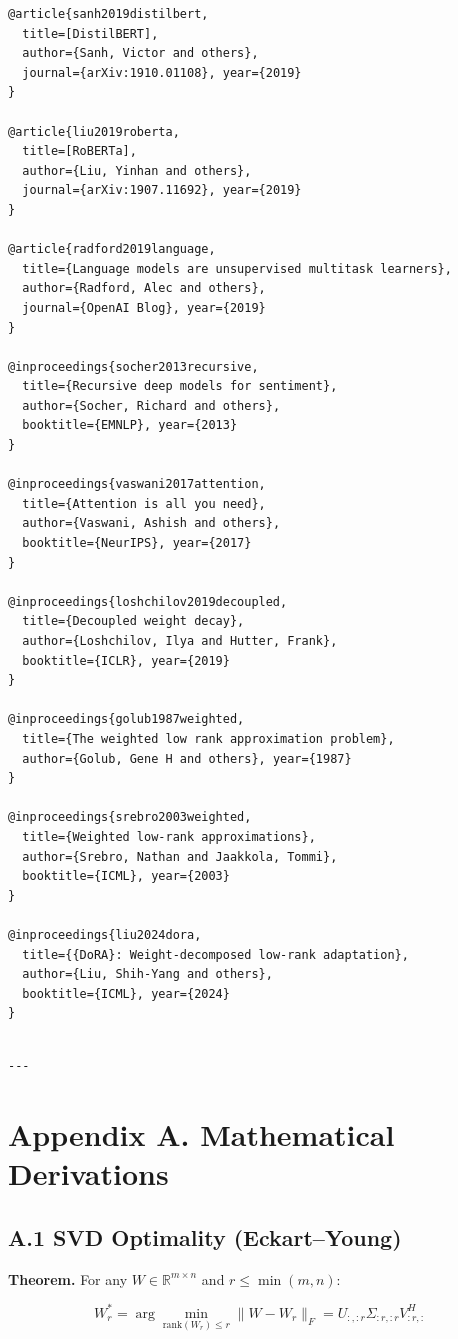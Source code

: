 \begin{lstlisting}
@article{sanh2019distilbert,
  title=[DistilBERT],
  author={Sanh, Victor and others},
  journal={arXiv:1910.01108}, year={2019}
}

@article{liu2019roberta,
  title=[RoBERTa],
  author={Liu, Yinhan and others},
  journal={arXiv:1907.11692}, year={2019}
}

@article{radford2019language,
  title={Language models are unsupervised multitask learners},
  author={Radford, Alec and others},
  journal={OpenAI Blog}, year={2019}
}

@inproceedings{socher2013recursive,
  title={Recursive deep models for sentiment},
  author={Socher, Richard and others},
  booktitle={EMNLP}, year={2013}
}

@inproceedings{vaswani2017attention,
  title={Attention is all you need},
  author={Vaswani, Ashish and others},
  booktitle={NeurIPS}, year={2017}
}

@inproceedings{loshchilov2019decoupled,
  title={Decoupled weight decay},
  author={Loshchilov, Ilya and Hutter, Frank},
  booktitle={ICLR}, year={2019}
}

@inproceedings{golub1987weighted,
  title={The weighted low rank approximation problem},
  author={Golub, Gene H and others}, year={1987}
}

@inproceedings{srebro2003weighted,
  title={Weighted low-rank approximations},
  author={Srebro, Nathan and Jaakkola, Tommi},
  booktitle={ICML}, year={2003}
}

@inproceedings{liu2024dora,
  title={{DoRA}: Weight-decomposed low-rank adaptation},
  author={Liu, Shih-Yang and others},
  booktitle={ICML}, year={2024}
}
\end{lstlisting}
\begin{lstlisting}

---
\end{lstlisting}


\section{Appendix A. Mathematical Derivations}

\subsection{A.1 SVD Optimality (Eckart--Young)}

\textbf{Theorem.} For any $W \in \mathbb{R}^{m \times n}$ and $r \leq \min(m, n)$:

\[
W_r^* = \arg\min_{\text{rank}(W_r) \leq r} \|W - W_r\|_F = U_{:, :r} \Sigma_{:r, :r} V_{:r, :}^H
\tag{A.1}
\]

